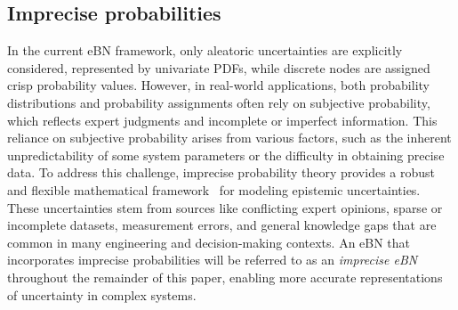 \subsection{Imprecise probabilities}
In the current eBN framework, only aleatoric uncertainties are explicitly considered, represented by univariate PDFs, while discrete nodes are assigned crisp probability values. However, in real-world applications, both probability distributions and probability assignments often rely on subjective probability, which reflects expert judgments and incomplete or imperfect information. This reliance on subjective probability arises from various factors, such as the inherent unpredictability of some system parameters or the difficulty in obtaining precise data. To address this challenge, imprecise probability theory provides a robust and flexible mathematical framework~\cite{beer_imprecise_2013-1} for modeling epistemic uncertainties. These uncertainties stem from sources like conflicting expert opinions, sparse or incomplete datasets, measurement errors, and general knowledge gaps that are common in many engineering and decision-making contexts. An eBN that incorporates imprecise probabilities will be referred to as an \textit{imprecise eBN} throughout the remainder of this paper, enabling more accurate representations of uncertainty in complex systems.


